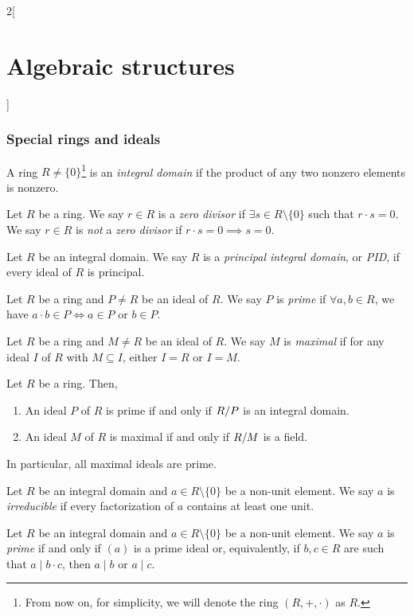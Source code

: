 \documentclass[../../../main.tex]{subfiles}
\begin{document}
\begin{multicols}{2}[\section{Algebraic structures}]
\subsubsection{Special rings and ideals}
\begin{definition}
    A ring $R\ne\{0\}$\footnote{From now on, for simplicity, we will denote the ring $(R,+,\cdot)$ as $R$.} is an \textit{integral domain} if the product of any two nonzero elements is nonzero.
\end{definition}
\begin{definition}
    Let $R$ be a ring. We say $r\in R$ is a \textit{zero divisor} if $\exists s\in R\setminus\{0\}$ such that $r\cdot s=0$. We say $r\in R$ is \textit{not} a \textit{zero divisor} if $r\cdot s=0\implies s=0$. 
\end{definition}
\begin{definition}
    Let $R$ be an integral domain. We say $R$ is a \textit{principal integral domain}, or \textit{PID}, if every ideal of $R$ is principal.
\end{definition}
\begin{definition}
    Let $R$ be a ring and $P\ne R$ be an ideal of $R$. We say $P$ is \textit{prime} if $\forall a,b\in R$, we have $a\cdot b\in P\iff a\in P\text{ or }b\in P$.
\end{definition}
\begin{definition}
    Let $R$ be a ring and $M\ne R$ be an ideal of $R$. We say $M$ is \textit{maximal} if for any ideal $I$ of $R$ with $M\subseteq I$, either $I=R$ or $I=M$.
\end{definition}
\begin{prop}
    Let $R$ be a ring. Then,
    \begin{enumerate}
        \item An ideal $P$ of $R$ is prime if and only if $\quot{R}{P}$ is an integral domain.
        \item An ideal $M$ of $R$ is maximal if and only if $\quot{R}{M}$ is a field.
    \end{enumerate}
    In particular, all maximal ideals are prime.
\end{prop}
\begin{definition}
    Let $R$ be an integral domain and $a\in R\setminus\{0\}$ be a non-unit element. We say $a$ is \textit{irreducible} if every factorization of $a$ contains at least one unit. 
\end{definition}
\begin{definition}
    Let $R$ be an integral domain and $a\in R\setminus\{0\}$ be a non-unit element. We say $a$ is \textit{prime} if and only if $(a)$ is a prime ideal or, equivalently, if $b,c\in R$ are such that $a\mid b\cdot c$, then $a\mid b$ or $a\mid c$. 

\end{definition}
\end{multicols}
\end{document}
